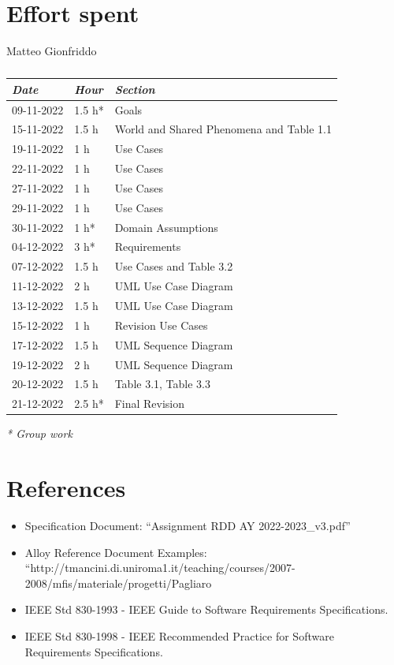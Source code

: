 \documentclass[a4paper]{report}
\begin{document}
\chapter{Effort spent}
\begin{table}[H]
\centering

Matteo Gionfriddo\\
\begin{tabular}{p{2cm}p{1.5cm}p{7cm}}
\toprule
\textit{Date} & \textit{Hour} & \textit{Section} \\ \midrule
09-11-2022 & 1.5 h* & Goals \\ \midrule
15-11-2022 & 1.5 h & World and Shared Phenomena and Table 1.1 \\ \midrule
19-11-2022 & 1 h & Use Cases\\ \midrule
22-11-2022 & 1 h & Use Cases \\ \midrule
27-11-2022 & 1 h & Use Cases \\ \midrule
29-11-2022 & 1 h & Use Cases \\ \midrule
30-11-2022 & 1 h* & Domain Assumptions \\ \midrule
04-12-2022 & 3 h* & Requirements \\ \midrule
07-12-2022 & 1.5 h & Use Cases and Table 3.2\\ \midrule
11-12-2022 & 2 h & UML Use Case Diagram\\  \midrule
13-12-2022 & 1.5 h & UML Use Case Diagram\\  \midrule
15-12-2022 & 1 h & Revision Use Cases\\ \midrule
17-12-2022 & 1.5 h & UML Sequence Diagram\\ \midrule
19-12-2022 & 2 h & UML Sequence Diagram\\ \midrule
20-12-2022 & 1.5 h & Table 3.1, Table 3.3 \\ \midrule
21-12-2022 & 2.5 h* & Final Revision \\ \midrule

\bottomrule
\end{tabular}
\caption[Matteo Gionfriddo's effort table]{}
\end{table}
\textit{* Group work}
\chapter{References}
\begin{itemize}
\item Specification Document: “Assignment RDD AY 2022-2023\_v3.pdf”
\item Alloy Reference Document Examples: “http://tmancini.di.uniroma1.it/teaching/courses/2007-2008/mfis/materiale/progetti/Pagliaro%
\item IEEE Std 830-1993 - IEEE Guide to Software Requirements Specifications.
\item IEEE Std 830-1998 - IEEE Recommended Practice for Software Requirements Specifications.
\end{itemize}
\end{document}
